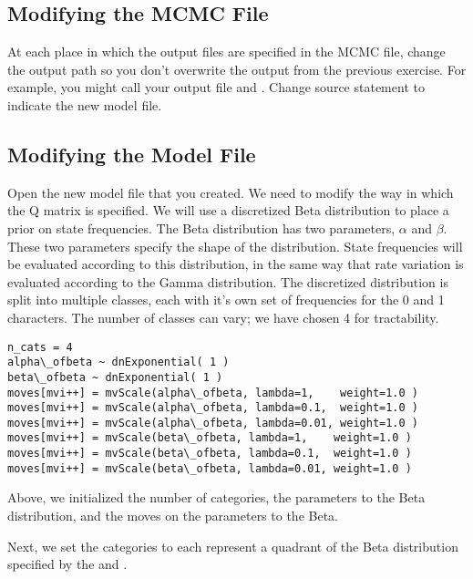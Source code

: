 \subsection{Modifying the MCMC File}

At each place in which the output files are specified in the MCMC file, change the output path so you don't overwrite the output from the previous exercise. 
For example, you might call your output file  and .
Change source statement to indicate the new model file.

\subsection{Modifying the Model File}

Open the new model file that you created. We need to modify the way in which the Q matrix is specified. 
We will use a discretized Beta distribution to place a prior on state frequencies. 
The Beta distribution has two parameters, $\alpha$ and $\beta$.
These two parameters specify the shape of the distribution.
State frequencies will be evaluated according to this distribution, in the same way that rate variation is evaluated according to the Gamma distribution. 
The discretized distribution is split into multiple classes, each with it's own set of frequencies for the 0 and 1 characters.
The number of classes can vary; we have chosen 4 for tractability.\par

{\tt \begin{snugshade*}
\begin{lstlisting}
n_cats = 4
alpha\_ofbeta ~ dnExponential( 1 )
beta\_ofbeta ~ dnExponential( 1 )
moves[mvi++] = mvScale(alpha\_ofbeta, lambda=1,    weight=1.0 )
moves[mvi++] = mvScale(alpha\_ofbeta, lambda=0.1,  weight=1.0 )
moves[mvi++] = mvScale(alpha\_ofbeta, lambda=0.01, weight=1.0 )
moves[mvi++] = mvScale(beta\_ofbeta, lambda=1,    weight=1.0 )
moves[mvi++] = mvScale(beta\_ofbeta, lambda=0.1,  weight=1.0 )
moves[mvi++] = mvScale(beta\_ofbeta, lambda=0.01, weight=1.0 )
\end{lstlisting}
\end{snugshade*}}

Above, we initialized the number of categories,  the parameters to the Beta distribution, and the moves on the parameters to the Beta. 

Next, we set the categories to each represent a quadrant of the Beta distribution specified by the  and .


